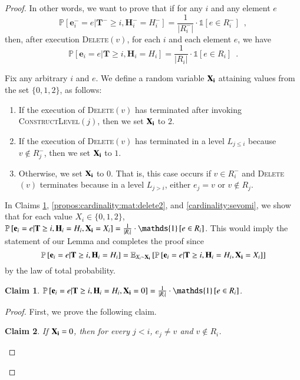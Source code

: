\documentclass[11pt]{article}
\newtheorem{claim}{Claim}[section]
\renewcommand{\Pr}[1]{\ensuremath{\mathbb{P}\left[#1\right]}}
\newcommand{\Exu}[2]{\ensuremath{\mathbb{E}_{#1}\left[#2\right]}}
\newcommand{\ind}[1]{\ensuremath{\mathds{1}\left[#1\right]}}
\newcommand{\constLevel}{\textsc{ConstructLevel}}
\newcommand{\deletev}{{\textsc{Delete}}}
\newcommand{\bE}{\ensuremath{\mathbf{e}}}
\newcommand{\bT}{\ensuremath{\mathbf{T}}}
\newcommand{\bH}{\ensuremath{\mathbf{H}}}
\begin{document}
\begin{proof}
In other words, we want to prove that if for any $i$ and any element $e$ 
\[
    \Pr{\bE_i^- = e | \bT^- \geq i, \bH_i^- = H_i^-} = 
    \frac{1}{|R_i^{-}|} \cdot \ind{e \in R_i^{-}} \enspace ,
\]
then, after execution \deletev$(v)$, for each $i$ and each element $e$, we have 
\[
    \Pr{\bE_i = e | \bT \geq i, \bH_i = H_i} = 
    \frac{1}{|R_i|} \cdot \ind{e \in R_i} \enspace .
\]


Fix any arbitrary $i$ and $e$. 
We define a random variable $\bold{X_i}$ attaining values from the set $ \{0, 1, 2\}$, as follows:
    \begin{enumerate}
    \item If the execution of \deletev$(v)$ has terminated after invoking \constLevel$(j)$, then we set $\bold{X_i}$ to $2$.
    \item If the execution of \deletev$(v)$ has terminated in a level $L_{j \leq i}$ because $v \notin R^-_j$, then we set $\bold{X_i}$ to $1$.
    \item Otherwise, we set $\bold{X_i}$ to $0$. 
    That is, this case occurs if $v \in R_i^-$ and \deletev$(v)$ terminates because in a level $L_{j > i}$, 
    either $e_j=v$ or $v \notin R_j$.
\end{enumerate}


In Claims \ref{propos:cardinality:mat:delete1}, \ref{propos:cardinality:mat:delete2}, and \ref{cardinality:sevomi},
we show that for each value $X_i \in \{0, 1, 2\}$, 
$\Pr{\bE_i = e | \bT \geq i, \bH_i = H_i, \bold{X_i} = X_i} = \frac{1}{|R_i|} \cdot \ind{e \in R_i}$. 
This would imply the statement of our Lemma and completes the proof since 
\begin{equation*}
    \Pr{\bE_i = e | \bT \geq i, \bH_i = H_i}=
\Exu{X_i\sim \bold{X_i} }{\Pr{\bE_i = e | \bT \geq i, \bH_i = H_i, \bold{X_i}=X_i}}
\end{equation*}
by the law of total probability.


\begin{claim}
\label{propos:cardinality:mat:delete1}
$\Pr{\bE_i = e | \bT \geq i, \bH_i = H_i, \bold{X_i} = 0} = \frac{1}{|R_i|} \cdot \ind{e \in R_i}$.    
\end{claim}




\begin{proof}
First, we prove the following claim. 

\begin{claim}
\label{prop:cardinality:not:in:x0}
If $\bold{X_i} = 0$,  then for every $j < i$, $e_j \ne v$ and $v \notin R_i$. 
\end{claim}



\end{proof}
\end{proof}
\end{document}
